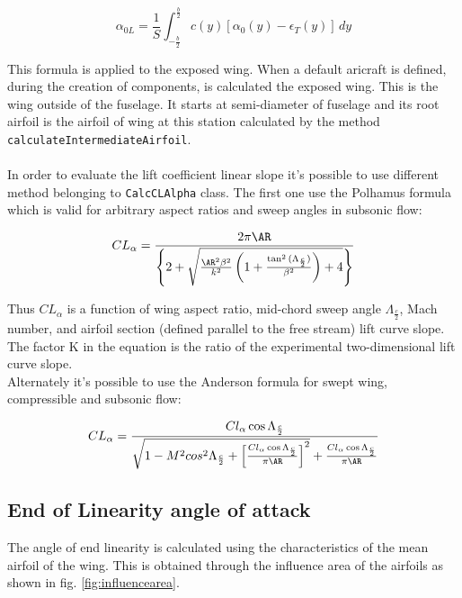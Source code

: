 \begin{equation}
\alpha_{0L} = \frac{1}{S}\int_{-\frac{b}{2}}^{\frac{b}{2}} c(y) [ \alpha_0(y) - \epsilon_T(y) ] \, dy
\end{equation}

This formula  is applied to the exposed wing. When a default aricraft is defined, during the creation of components, is calculated the exposed wing. This is the wing outside of the fuselage. It starts at semi-diameter of fuselage and its root airfoil is the airfoil of wing  at this station calculated by the method \texttt{calculateIntermediateAirfoil}.\\ \\

In order to evaluate the lift coefficient linear slope  it's possible to use different method belonging to \texttt{CalcCLAlpha} class. The first one use the Polhamus formula which is valid for arbitrary aspect ratios and sweep angles in subsonic flow:

\begin{equation}
CL_{\alpha} = \frac{2 \pi \AR}{ \left\{ 2 + \sqrt{\frac{\AR^2 \beta^2}{k^2} \left ( 1 + \frac{\tan^2{(\Lambda_{\frac{c}{2}})}}{\beta^2} \right) + 4 }\right\}}
\end{equation}

Thus $CL_{\alpha}$  is a function of wing aspect ratio, mid-chord sweep angle $\Lambda_{\frac{c}{2}}$, Mach number, and airfoil section (defined parallel to the free stream) lift curve slope. The factor K in the equation is the ratio of the experimental two-dimensional lift curve slope.\\
Alternately it's possible to use the Anderson formula for swept wing, compressible and subsonic flow:

\begin{equation}
CL_{\alpha} = 
\frac{Cl_{\alpha} \cos{\Lambda_{\frac{c}{2}}}}
{\sqrt{1 - M^2  cos^2 {\Lambda_{\frac{c}{2}}}
 + \left[ \frac{Cl_{\alpha} \cos{\Lambda_{\frac{c}{2}}}}{\pi \AR}\right]^2} + \frac{Cl_{\alpha} \cos{\Lambda_{\frac{c}{2}}}}{\pi \AR}}
\end{equation}



\subsection{End of Linearity angle of attack}

The angle of end linearity is calculated using the characteristics of the mean airfoil of the wing. This is obtained through the influence area of the airfoils as shown in fig. \ref{fig:influencearea}.

